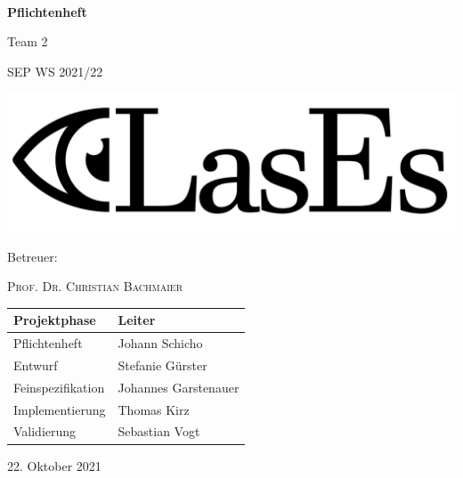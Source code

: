 \documentclass[a4paper,11pt]{article}
\newcommand{\doubletitle}[2]{\title{#1 \\ [1ex] \normalsize #2}}
\newcommand{\extauthor}[2]{\author{#1 \\ \normalsize #2}}
\begin{document}
	\begin{titlepage}
		\centering

		$~$

		\vspace{0.2cm} %

		\Huge \textbf{Pflichtenheft} \vspace{1cm}

		Team 2
		\Large

		SEP WS 2021/22

		\vspace{2cm}

		\includegraphics[width=0.8\linewidth]{graphics/LasEs-logo}

		\vspace{2cm}

		Betreuer:

		\textsc{Prof. Dr. Christian Bachmaier}

		\vspace{1cm}

		\begin{table}[H]
			\centering
			\Large
			\begin{tabular}{ll}
				\toprule
				\textbf{Projektphase} & \textbf{Leiter} \\
				\midrule
				Pflichtenheft & Johann Schicho \\
				Entwurf & Stefanie Gürster \\
				Feinspezifikation & Johannes Garstenauer \\
				Implementierung & Thomas Kirz \\
				Validierung & Sebastian Vogt \\
				\bottomrule
			\end{tabular}
		\end{table}

	\vspace{1cm}

	22. Oktober 2021

	\end{titlepage}


\end{document}

